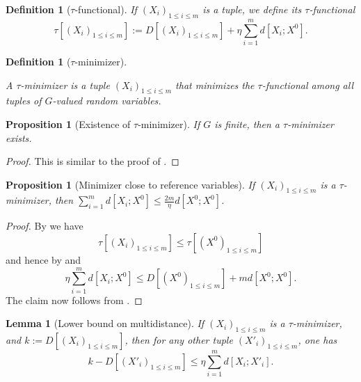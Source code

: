 \documentclass[10pt,a4paper]{article}
\newtheorem{lemma}[theorem]{Lemma}
\newtheorem{proposition}[theorem]{Proposition}
\newtheorem{definition}[theorem]{Definition}
\newcommand{\lean}[1]{}
\newcommand{\uses}[1]{}
\newcommand{\leanok}{}
\begin{document}
\begin{definition}[$\tau$-functional]\label{tau-def-multi}\uses{eta-def-multi}\lean{multiTau}\uses{multidist-def}\leanok  If $(X_i)_{1 \leq i \leq m}$ is a tuple, we define its $\tau$-functional
$$ \tau[ (X_i)_{1 \leq i \leq m}] := D[(X_i)_{1 \leq i \leq m}] + \eta \sum_{i=1}^m d[X_i; X^0].$$
\end{definition}

\begin{definition}[$\tau$-minimizer]
  \label{tau-min-multi}
  \uses{tau-def-multi}
  \lean{multiTauMinimizes}
  \leanok

  A $\tau$-minimizer is a tuple $(X_i)_{1 \leq i \leq m}$ that minimizes the $\tau$-functional
  among all tuples of $G$-valued random variables.
\end{definition}

\begin{proposition}[Existence of $\tau$-minimizer]\label{tau-min-exist-multi}\lean{multiTau_continuous, multiTau_min_exists}\leanok  If $G$ is finite, then a $\tau$-minimizer exists.
\end{proposition}

\begin{proof}\uses{tau-def-multi}\leanok This is similar to the proof of .
\end{proof}

\begin{proposition}[Minimizer close to reference variables]\label{tau-ref}\lean{multiTau_min_sum_le}\leanok  If $(X_i)_{1 \leq i \leq m}$ is a $\tau$-minimizer, then $\sum_{i=1}^m d[X_i; X^0] \leq \frac{2m}{\eta} d[X^0; X^0]$.
\end{proposition}

\begin{proof}\uses{tau-min-multi, multidist-nonneg, multidist-ruzsa-III}\leanok  By  we have
  $$ \tau[ (X_i)_{1 \leq i \leq m}] \leq \tau[ (X^0)_{1 \leq i \leq m}]$$
and hence by  and 
$$ \eta \sum_{i=1}^m d[X_i; X^0] \leq D[(X^0)_{1 \leq i \leq m}] + m d[X^0; X^0].$$
The claim now follows from .
\end{proof}

\begin{lemma}[Lower bound on multidistance]\label{multidist-lower}\lean{sub_multiDistance_le}\leanok  If  $(X_i)_{1 \leq i \leq m}$ is a $\tau$-minimizer, and $k := D[(X_i)_{1 \leq i \leq m}]$, then for any other tuple $(X'_i)_{1 \leq i \leq m}$, one has
  $$ k - D[(X'_i)_{1 \leq i \leq m}] \leq \eta \sum_{i=1}^m d[X_i; X'_i].$$
\end{lemma}
\end{document}
